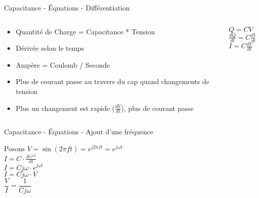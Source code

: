 \begin{frame}{Capacitance - Équations - Différentiation}
    \begin{columns}
        \begin{column}{0.5\textwidth}
            \begin{itemize}
                \item Quantité de Charge = Capacitance * Tension
                \item Dérivée selon le temps
                \item Ampère = Coulomb / Seconde
                \bigskip
                \item Plus de courant passe au travers du cap quand changements de tension
                \item Plus un changement est rapide ($\frac{dV}{dt}$), plus de courant passe
            \end{itemize}
        \end{column}
        \begin{column}{0.5\textwidth}
            \Large{
            \begin{center}
                $Q = CV$\\
                \vspace{10pt}
                $\frac{dQ}{dt} = C \frac{dV}{dt}$\\
                \vspace{10pt}
                $I = C \frac{dV}{dt}$\\
            \end{center}
            }
        \end{column}
    \end{columns}
\end{frame}

\begin{frame}{Capacitance - Équations - Ajout d'une fréquence}
    \begin{center}
        \Large{
            Posons $V = \sin(2 \pi f t) = e^{j 2 \pi f t} = e^{j \omega t}$\\
            \vspace{15pt}
            $I = C \cdot \frac{de^{j \omega t}}{dt}$\\
            \vspace{5pt}
            $I = C j \omega \cdot e^{j \omega t}$\\
            \vspace{5pt}
            $I = C j \omega \cdot V$\\
            \vspace{20pt}
            $\dfrac{V}{I} = \dfrac{1}{C j \omega}$\\
        }
    \end{center}
\end{frame}

